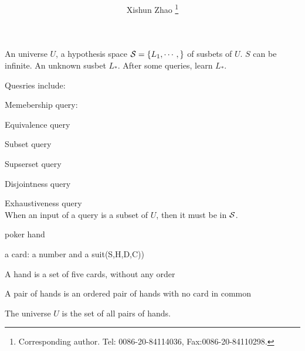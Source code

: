\documentclass[12pt]{article}
\begin{document}
\title{
}

\author{
Xishun Zhao \footnote{Corresponding author. Tel: 0086-20-84114036,
Fax:0086-20-84110298.}
}





\maketitle

\begin{abstract}

\end{abstract}

An universe $U$, a hypothesis space ${\cal S}=\{L_1, \cdots, \}$ of susbets of $U$. $S$ can be infinite. An unknown susbet $L_{*}$. 
 After some queries, learn $L_{*}$. 
 
Quesries include:

Memebership query:

Equivalence query 

Subset query

Supserset query

Disjointness query

Exhaustiveness query\\

When an input of a query is a subset of $U$, then it must be in ${\cal S}$.



poker hand


a card: a number and a suit(S,H,D,C))

A hand is a set of five cards, without any order

A pair of hands is an ordered pair of hands with no card in common

The universe $U$ is the set of all pairs of hands. \\

\end{document}
